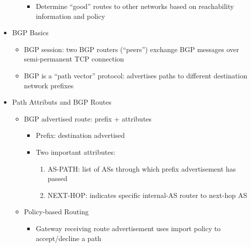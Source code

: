 \begin{itemize}
\begin{itemize}
\begin{itemize}
          \item Determine ``good'' routes to other networks based on reachability information and policy

        \end{itemize}

    \end{itemize}

  \item BGP Basics

    \begin{itemize}

      \item BGP session: two BGP routers (``peers'') exchange BGP messages over semi-permanent TCP connection

      \item BGP is a ``path vector'' protocol: advertises paths to different destination network prefixes

    \end{itemize}

  \item Path Attributs and BGP Routes

    \begin{itemize}

      \item BGP advertised route: prefix + attributes

        \begin{itemize}

          \item Prefix: destination advertised

          \item Two important attributes:

            \begin{enumerate}

              \item AS-PATH: list of ASs through which prefix advertisement has passed

              \item NEXT-HOP: indicates specific internal-AS router to next-hop AS

            \end{enumerate}

        \end{itemize}

      \item Policy-based Routing

        \begin{itemize}

          \item Gateway receiving route advertisement uses import policy to accept/decline a path

        \end{itemize}

    \end{itemize}

\end{itemize}



